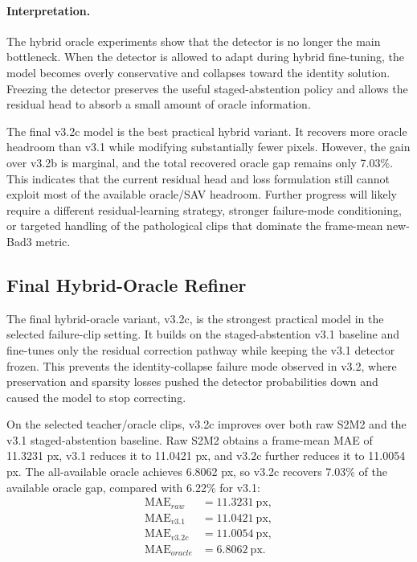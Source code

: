 \documentclass[11pt,a4paper]{article}
\begin{document}
\paragraph{Interpretation.}
The hybrid oracle experiments show that the detector is no longer the main
bottleneck. When the detector is allowed to adapt during hybrid fine-tuning, the
model becomes overly conservative and collapses toward the identity solution.
Freezing the detector preserves the useful staged-abstention policy and allows
the residual head to absorb a small amount of oracle information.

The final v3.2c model is the best practical hybrid variant. It recovers more
oracle headroom than v3.1 while modifying substantially fewer pixels. However,
the gain over v3.2b is marginal, and the total recovered oracle gap remains only
7.03\%. This indicates that the current residual head and loss formulation still
cannot exploit most of the available oracle/SAV headroom. Further progress will
likely require a different residual-learning strategy, stronger failure-mode
conditioning, or targeted handling of the pathological clips that dominate the
frame-mean new-Bad3 metric.


\subsection{Final Hybrid-Oracle Refiner}

The final hybrid-oracle variant, v3.2c, is the strongest practical model in the
selected failure-clip setting. It builds on the staged-abstention v3.1 baseline
and fine-tunes only the residual correction pathway while keeping the v3.1
detector frozen. This prevents the identity-collapse failure mode observed in
v3.2, where preservation and sparsity losses pushed the detector probabilities
down and caused the model to stop correcting.

On the selected teacher/oracle clips, v3.2c improves over both raw S2M2 and the
v3.1 staged-abstention baseline. Raw S2M2 obtains a frame-mean MAE of
11.3231 px, v3.1 reduces it to 11.0421 px, and v3.2c further reduces it to
11.0054 px. The all-available oracle achieves 6.8062 px, so v3.2c recovers
7.03\% of the available oracle gap, compared with 6.22\% for v3.1:
\[
\begin{aligned}
\mathrm{MAE}_{raw} &= 11.3231~\mathrm{px}, \\
\mathrm{MAE}_{v3.1} &= 11.0421~\mathrm{px}, \\
\mathrm{MAE}_{v3.2c} &= 11.0054~\mathrm{px}, \\
\mathrm{MAE}_{oracle} &= 6.8062~\mathrm{px}.
\end{aligned}
\]
\end{document}
